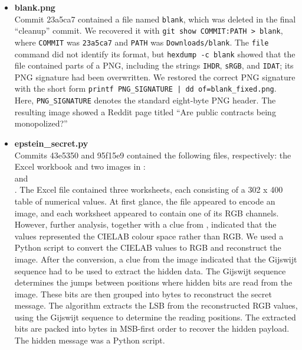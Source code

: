 \documentclass[11pt,a4paper,final,oneside]{article}
\begin{document}
\begin{itemize}
  \item \textbf{blank.png}
  \\Commit 23a5ca7 contained a file named
  \texttt{blank}, which was deleted in the final ``cleanup'' commit. We
  recovered it with \texttt{git show COMMIT:PATH > blank}, where
  \texttt{COMMIT} was \texttt{23a5ca7} and \texttt{PATH} was
  \texttt{Downloads/blank}. The \texttt{file} command did not identify its
  format, but
  \texttt{hexdump -c blank} showed that the file contained parts of a PNG,
  including the strings \texttt{IHDR}, \texttt{sRGB}, and \texttt{IDAT}; its
  PNG signature had been overwritten. We restored the correct PNG signature
  with the short form \texttt{printf PNG\_SIGNATURE | dd of=blank\_fixed.png}.
  Here, \texttt{PNG\_SIGNATURE} denotes the standard eight-byte PNG header.
  The resulting image showed a Reddit page titled ``Are public contracts
  being monopolized?''

  \item \textbf{epstein\_secret.py} 
  \\Commits 43e5350 and 95f15e9 contained the
  following files, respectively: the Excel workbook
   and two images in
  :\\ 
  and\\ .
  The Excel file contained three worksheets, each consisting of a 302 x 400
  table of numerical values. At first glance, the file appeared to encode an
  image, and each worksheet appeared to contain one of its RGB channels.
  However, further analysis, together with a clue from
  , indicated
  that the values represented the CIELAB colour space rather than RGB. We
  used a Python script to convert the CIELAB values to RGB and reconstruct the
  image.
  After the conversion, a clue from the image
   indicated that the Gijswijt
  sequence had to be used to extract the hidden data. The Gijswijt sequence
  determines the jumps between positions where hidden bits are read from the
  image. These bits are then grouped into bytes to reconstruct the secret
  message. The algorithm extracts the LSB from the reconstructed RGB values, 
  using the Gijswijt sequence to determine the reading positions. 
  The extracted bits are packed into bytes in MSB-first order to recover the hidden payload.
  The hidden message was a Python script.


\end{itemize}
\end{document}
